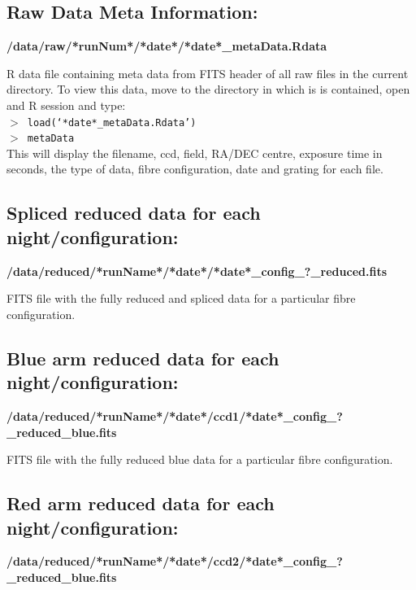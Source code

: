 \documentclass[12pt]{article}
\begin{document}
\subsection{Raw Data Meta Information:}

\textbf{/data/raw/*runNum*/*date*/*date*\_metaData.Rdata} 

R data file containing meta data from FITS header of all raw files in the current directory. To view this data, move to the directory in which is is contained, open and R session and type: \\

\hspace{10mm}  \texttt{$>$ load(`*date*\_metaData.Rdata')}\\

\hspace{10mm}  \texttt{$>$ metaData}\\
  
 
 This will display the filename, ccd, field, RA/DEC centre, exposure time in seconds, the type of data, fibre configuration, date and grating for each file.  

 
\subsection{Spliced reduced data for each night/configuration:} 
 
 \textbf{/data/reduced/*runName*/*date*/*date*\_config\_?\_reduced.fits} 
 
 FITS file with the fully reduced and spliced data for a particular fibre configuration.

  
\subsection{Blue arm reduced data for each night/configuration:} 
   
   \textbf{/data/reduced/*runName*/*date*/ccd1/*date*\_config\_?\_reduced\_blue.fits} 
   
   FITS file with the fully reduced blue data for a particular fibre configuration.
 
  
\subsection{Red arm reduced data for each night/configuration:} 
  
  \textbf{/data/reduced/*runName*/*date*/ccd2/*date*\_config\_?\_reduced\_blue.fits} 
  
\end{document}
